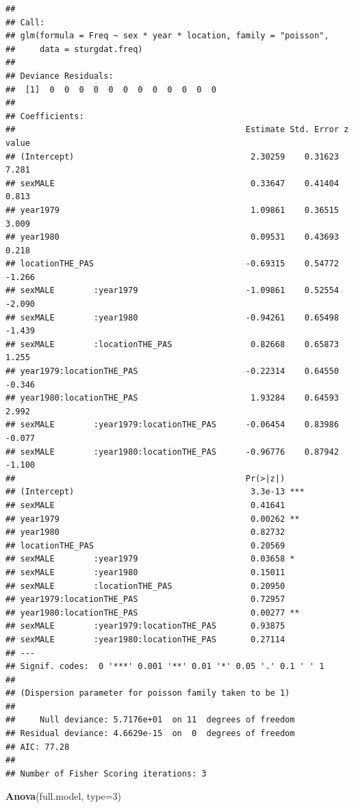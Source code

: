 \documentclass[12pt,]{book}
\newenvironment{Shaded}{\begin{snugshade}}{\end{snugshade}}
\newcommand{\DataTypeTok}[1]{\textcolor[rgb]{0.13,0.29,0.53}{#1}}
\newcommand{\DecValTok}[1]{\textcolor[rgb]{0.00,0.00,0.81}{#1}}
\newcommand{\KeywordTok}[1]{\textcolor[rgb]{0.13,0.29,0.53}{\textbf{#1}}}
\newcommand{\NormalTok}[1]{#1}
\begin{document}
\begin{verbatim}
## 
## Call:
## glm(formula = Freq ~ sex * year * location, family = "poisson", 
##     data = sturgdat.freq)
## 
## Deviance Residuals: 
##  [1]  0  0  0  0  0  0  0  0  0  0  0  0
## 
## Coefficients:
##                                               Estimate Std. Error z value
## (Intercept)                                    2.30259    0.31623   7.281
## sexMALE                                        0.33647    0.41404   0.813
## year1979                                       1.09861    0.36515   3.009
## year1980                                       0.09531    0.43693   0.218
## locationTHE_PAS                               -0.69315    0.54772  -1.266
## sexMALE        :year1979                      -1.09861    0.52554  -2.090
## sexMALE        :year1980                      -0.94261    0.65498  -1.439
## sexMALE        :locationTHE_PAS                0.82668    0.65873   1.255
## year1979:locationTHE_PAS                      -0.22314    0.64550  -0.346
## year1980:locationTHE_PAS                       1.93284    0.64593   2.992
## sexMALE        :year1979:locationTHE_PAS      -0.06454    0.83986  -0.077
## sexMALE        :year1980:locationTHE_PAS      -0.96776    0.87942  -1.100
##                                               Pr(>|z|)    
## (Intercept)                                    3.3e-13 ***
## sexMALE                                        0.41641    
## year1979                                       0.00262 ** 
## year1980                                       0.82732    
## locationTHE_PAS                                0.20569    
## sexMALE        :year1979                       0.03658 *  
## sexMALE        :year1980                       0.15011    
## sexMALE        :locationTHE_PAS                0.20950    
## year1979:locationTHE_PAS                       0.72957    
## year1980:locationTHE_PAS                       0.00277 ** 
## sexMALE        :year1979:locationTHE_PAS       0.93875    
## sexMALE        :year1980:locationTHE_PAS       0.27114    
## ---
## Signif. codes:  0 '***' 0.001 '**' 0.01 '*' 0.05 '.' 0.1 ' ' 1
## 
## (Dispersion parameter for poisson family taken to be 1)
## 
##     Null deviance: 5.7176e+01  on 11  degrees of freedom
## Residual deviance: 4.6629e-15  on  0  degrees of freedom
## AIC: 77.28
## 
## Number of Fisher Scoring iterations: 3
\end{verbatim}

\begin{Shaded}
\begin{Highlighting}[]
\KeywordTok{Anova}\NormalTok{(full.model, }\DataTypeTok{type=}\DecValTok{3}\NormalTok{)}
\end{Highlighting}
\end{Shaded}
\end{document}
